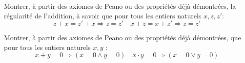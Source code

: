 \documentclass[french]{report}
\begin{document}
\begin{exo}
    Montrer, à partir des axiomes de Peano ou des propriétés déjà démontrées, la
    régularité de l'addition, à savoir que pour tous les entiers naturels \(x,z,z'\):
    \[z+x=z'+x\Rightarrow z=z'\quad x+z=x+z'\Rightarrow z=z'\]
\end{exo}

\begin{exo}
    Montrer, à partir des axiomes de Peano ou des propriétés déjà démontrées,
    que pour tous les entiers naturels \(x,y\) :
    \[x+y=0\Rightarrow\left(x=0\land y=0\right)\quad x\cdot
    y=0\Rightarrow\left(x=0\lor y=0\right)\]
\end{exo}
\end{document}
